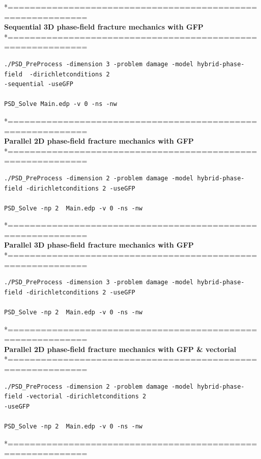 *============================================================\\
\textbf{ Sequential 3D phase-field fracture mechanics with GFP} \\
*============================================================\\
\begin{lstlisting}[style=Linux]
./PSD_PreProcess -dimension 3 -problem damage -model hybrid-phase-field  -dirichletconditions 2 
-sequential -useGFP   

PSD_Solve Main.edp -v 0 -ns -nw   
\end{lstlisting}
*============================================================\\
\textbf{ Parallel 2D phase-field fracture mechanics with GFP} \\
*============================================================\\
\begin{lstlisting}[style=Linux]
./PSD_PreProcess -dimension 2 -problem damage -model hybrid-phase-field -dirichletconditions 2 -useGFP   

PSD_Solve -np 2  Main.edp -v 0 -ns -nw   
\end{lstlisting}
*============================================================\\
\textbf{ Parallel 3D phase-field fracture mechanics with GFP }\\
*============================================================\\
\begin{lstlisting}[style=Linux]
./PSD_PreProcess -dimension 3 -problem damage -model hybrid-phase-field -dirichletconditions 2 -useGFP   

PSD_Solve -np 2  Main.edp -v 0 -ns -nw   
\end{lstlisting}
*============================================================\\
\textbf{ Parallel 2D phase-field fracture mechanics with GFP \& vectorial} \\
*============================================================\\
\begin{lstlisting}[style=Linux]
./PSD_PreProcess -dimension 2 -problem damage -model hybrid-phase-field -vectorial -dirichletconditions 2 
-useGFP   

PSD_Solve -np 2  Main.edp -v 0 -ns -nw   
\end{lstlisting}
*============================================================\\
